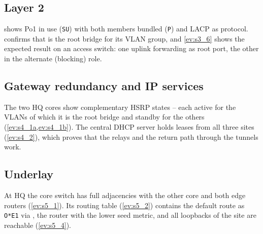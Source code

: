 \subsection{Layer 2}\label{sec:test-l2}
 shows Po1 in use (\texttt{SU}) with both members bundled (\texttt{P}) and LACP as protocol.
 confirms that  is the root bridge for its VLAN group, and \cref{ev:s3_6}
shows the expected result on an access switch: one uplink forwarding as root port, the other in the
alternate (blocking) role.

\subsection{Gateway redundancy and IP services}\label{sec:test-fhrp}
The two HQ cores show complementary HSRP states -- each active for the VLANs of which it is the root bridge
and standby for the others (\cref{ev:s4_1a,ev:s4_1b}). The central DHCP server holds leases from all three
sites (\cref{ev:s4_2}), which proves that the relays and the return path through the tunnels work.

\subsection{Underlay}\label{sec:test-underlay}
At HQ the core switch has full adjacencies with the other core and both edge routers (\cref{ev:s5_1}). Its
routing table (\cref{ev:s5_2}) contains the default route as \texttt{O*E1} via , the
router with the lower seed metric, and all loopbacks of the site are reachable (\cref{ev:s5_4}).

